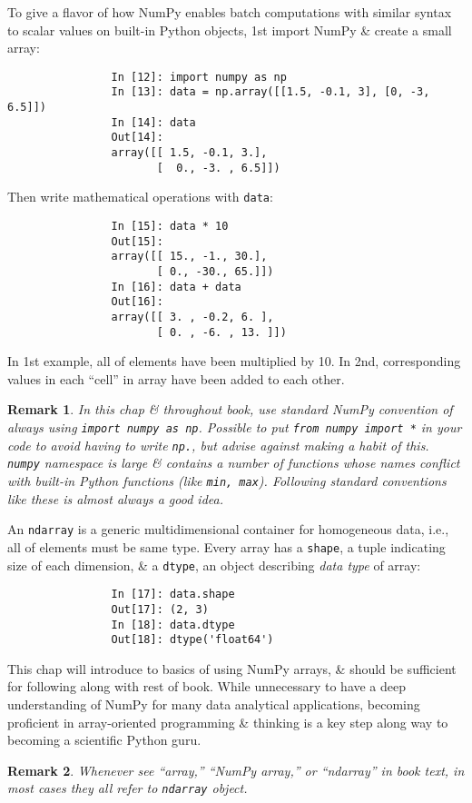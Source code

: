 \documentclass{article}
\newtheorem{remark}{Remark}
\begin{document}
\begin{enumerate}
\begin{itemize}
\begin{itemize}
			To give a flavor of how NumPy enables batch computations with similar syntax to scalar values on built-in Python objects, 1st import NumPy \& create a small array:
			\begin{verbatim}
				In [12]: import numpy as np
				In [13]: data = np.array([[1.5, -0.1, 3], [0, -3, 6.5]])
				In [14]: data
				Out[14]:
				array([[ 1.5, -0.1, 3.],
				       [  0., -3. , 6.5]])
			\end{verbatim}
			Then write mathematical operations with {\tt data}:
			\begin{verbatim}
				In [15]: data * 10
				Out[15]:
				array([[ 15., -1., 30.],
				       [ 0., -30., 65.]])
				In [16]: data + data
				Out[16]:
				array([[ 3. , -0.2, 6. ],
				       [ 0. , -6. , 13. ]])
			\end{verbatim}
			In 1st example, all of elements have been multiplied by 10. In 2nd, corresponding values in each ``cell'' in array have been added to each other.
			\begin{remark}
				In this chap \& throughout book, use standard NumPy convention of always using {\tt import numpy as np}. Possible to put {\tt from numpy import *} in your code to avoid having to write {\tt np.}, but advise against making a habit of this. {\tt numpy} namespace is large \& contains a number of functions whose names conflict with built-in Python functions (like {\tt min, max}). Following standard conventions like these is almost always a good idea.
			\end{remark}
			An {\tt ndarray} is a generic multidimensional container for homogeneous data, i.e., all of elements must be same type. Every array has a {\tt shape}, a tuple indicating size of each dimension, \& a {\tt dtype}, an object describing {\it data type} of array:
			\begin{verbatim}
				In [17]: data.shape
				Out[17]: (2, 3)
				In [18]: data.dtype
				Out[18]: dtype('float64')
			\end{verbatim}
			This chap will introduce to basics of using NumPy arrays, \& should be sufficient for following along with rest of book. While unnecessary to have a deep understanding of NumPy for many data analytical applications, becoming proficient in array-oriented programming \& thinking is a key step along way to becoming a scientific Python guru.
			\begin{remark}
				Whenever see ``array,'' ``NumPy array,'' or ``ndarray'' in book text, in most cases they all refer to {\tt ndarray} object.
			\end{remark}
			

\end{itemize}
\end{itemize}
\end{enumerate}
\end{document}
